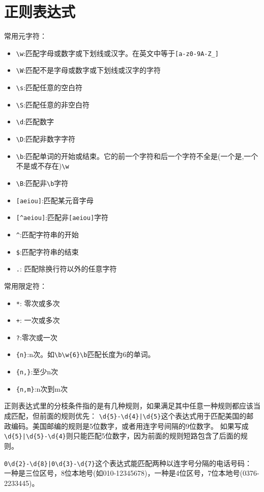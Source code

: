 \section{正则表达式}

常用元字符：
\begin{itemize}
\item \verb$\w$:匹配字母或数字或下划线或汉字。在英文中等于\verb$[a-z0-9A-Z_]$
\item \verb$\W$:匹配不是字母或数字或下划线或汉字的字符
\item \verb$\s$:匹配任意的空白符
\item \verb$\S$:匹配任意的非空白符
\item \verb$\d$:匹配数字
\item \verb$\D$:匹配非数字字符
\item \verb$\b$:匹配单词的开始或结束。它的前一个字符和后一个字符不全是(一个是,一个不是或不存在)\verb$\w$
\item \verb$\B$:匹配非\verb$\b$字符
\item \verb$[aeiou]$:匹配某元音字母
\item \verb$[^aeiou]$:匹配非\verb$[aeiou]$字符
\item \verb$^$:匹配字符串的开始
\item \verb|$|:匹配字符串的结束
\item \verb$.$: 匹配除换行符以外的任意字符
\end{itemize}

常用限定符：
\begin{itemize}
\item \verb$*$: 零次或多次
\item \verb$+$: 一次或多次
\item \verb$?$:零次或一次
\item \verb${n}$:n次。如\verb$\b\w{6}\b$匹配长度为6的单词。
\item \verb${n,}$:至少n次
\item \verb${n,m}$:n次到m次
\end{itemize}

正则表达式里的分枝条件指的是有几种规则，如果满足其中任意一种规则都应该当成匹配，但前面的规则优先：
\verb$\d{5}-\d{4}|\d{5}$这个表达式用于匹配美国的邮政编码。美国邮编的规则是5位数字，或者用连字号间隔的9位数字。
如果写成\verb$\d{5}|\d{5}-\d{4}$则只能匹配5位数字，因为前面的规则短路包含了后面的规则。

\verb$0\d{2}-\d{8}|0\d{3}-\d{7}$这个表达式能匹配两种以连字号分隔的电话号码：
一种是三位区号，8位本地号(如010-12345678)，一种是4位区号，7位本地号(0376-2233445)。

